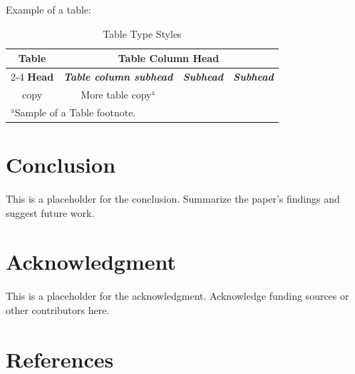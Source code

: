 \documentclass[conference]{IEEEtran}
\begin{document}
Example of a table:
\begin{table}[htbp]
\caption{Table Type Styles}
\begin{center}
\begin{tabular}{|c|c|c|c|}
\hline
\textbf{Table}&\multicolumn{3}{|c|}{\textbf{Table Column Head}} \\
\cline{2-4} 
\textbf{Head} & \textbf{\textit{Table column subhead}}& \textbf{\textit{Subhead}}& \textbf{\textit{Subhead}} \\
\hline
copy& More table copy$^{\mathrm{a}}$& &  \\
\hline
\multicolumn{4}{l}{$^{\mathrm{a}}$Sample of a Table footnote.}
\end{tabular}
\label{tab1}
\end{center}
\end{table}

\section{Conclusion}
This is a placeholder for the conclusion. Summarize the paper's findings and suggest future work.

\section*{Acknowledgment}
This is a placeholder for the acknowledgment. Acknowledge funding sources or other contributors here.


\section*{References}
\printbibliography
\end{document}

